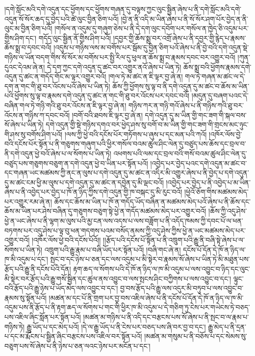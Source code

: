 །དགེ་སློང་མའི་དགེ་འདུན་དང་ཕྱོགས་དང་ཕྱོགས་གཞན་དུ་བལྟས་ཀྱང་ལུང་སྦྱིན་ཞེས་པ་ནི་དགེ་སློང་མའི་དགེ་འདུན་སོ་སོར་ཆད་དུ་བྱེད་པའི་ཚེ་ལུང་བྱིན་ཅིག་པའོ། །བྱེ་ན་ནི་འདི་མ་ཡིན་ཞེས་པ་ནི་སོ་སོར་ཤག་པོར་བྱེད་ན་ནི་ལུང་མ་བྱིན་ཅིག་པའོ། །གསོལ་ན་འདུམ་དུ་གཞུག་ཅེས་པ་ནི་དེ་དག་ལུང་དབོག་པར་གསོལ་ན་ཁྱེད་ཅི་འདུམ་པར་གྱིས་ཤིག་དང་། གདོད་ལུང་སྦྱིན་ནོ་གྱིས་ཤིག་པའོ། །དབྱར་གྱི་ཆོས་སྨྲ་བར་འགྲོ་ཞེས་པ་ནི་དབྱར་གྱི་རྙེད་པ་རྣམས་ཆོས་སྨྲ་བ་དབང་བའོ། །འདུས་པ་གཉིས་ལས་མ་བགོས་པར་སྦོམ་དུ་བྱིན་ཅིག་པའོ་ཞེས་པ་ནི་བྱེ་བའི་དགེ་འདུན་སྡེ་གཉིས་ལ་ཡོན་བདག་གིས་སོ་སོར་མ་བགོས་པར་སྤྱི་རིལ་དུ་ཕུལ་ན་ཆོས་སྨྲ་བ་རྣམས་དབང་བར་འགྱུར་བའོ། །ཀུན་དུའང་དེའམ་ཞེ་ན། དེ་དག་ཀྱང་དགེ་འདུན་དུ་ཚང་བར་འགྱུར་ནའོ་ཞེས་པ་ཡིན་ཏེ། ཆོས་སྨྲ་བའི་ཕྱོགས་རྣམས་དགེ་འདུན་དུ་ཚང་ན་གདོད་གོང་མ་ལྟར་འགྱུར་བའོ། །གལ་ཏེ་མ་ཚང་ན་ཇི་ལྟར་བྱ་ཞེ་ན། གལ་ཏེ་གཞན་མ་ཚང་ལ་དེ་དག་ན་གང་གི་ཐུ་བར་འོངས་པའོ་ཞེས་པ་ཡིན་ཏེ། ཆོས་ཀྱི་ཕྱོགས་སུ་ལྟ་བ་ནི་དགེ་འདུན་དུ་མ་ཚང་བ་ཆོས་མ་ཡིན་པའི་ཕྱོགས་སུ་ལྟ་བ་རྣམས་དགེ་འདུན་དུ་ཚང་ན་གང་གི་ཐུ་བར་འོངས་པར་དབང་བའོ། །མདུན་དུ་བཞག་པའང་དེ་བཞིན་གལ་ཏེ་གཉི་གའི་ཐུ་བར་འོངས་ན་ཇི་ལྟར་བྱ་ཞེ་ན། གཉིས་ཀར་ན་གཉི་གའོ་ཞེས་པ་ནི་གཉིས་ཀའི་ཐུ་བར་འོངས་ན་གཉིས་ཀ་དབང་བའོ། །བགོ་བའི་ཐབས་ཇི་ལྟར་བྱ་ཞེ་ན། དགེ་འདུན་དུ་མ་ཡིན་གྱི་གང་ཟག་གི་སྐལ་བས་སོ་ཞེས་པ་ཡིན་ཏེ། དགེ་འདུན་གྱི་སྡེ་གཉིས་དགའ་བར་ཕྱེད་ཤས་སུ་བགོ་བ་མ་ཡིན་གྱི་གང་ཟག་གི་གྲངས་མང་ཉུང་གི་ཤས་སུ་བགོས་ཤིག་པའོ། །ལས་ཀྱི་ཕྱེ་བའི་དངོས་པོར་གཏོགས་པ་ཞུས་པ་དང་མན་པའི་ཀའོ། །འཁོར་ལོས་བྱེ་བའི་དངོས་པོར་སྟོན་པ་ནི་གཅུགས་གཞུག་པའི་ཕྱིར་གསོལ་བའམ་ཚུལ་ཤིང་ལེན་དུ་བཙུད་པས་ཆོས་དང་བྲལ་བ་ནི་དགེ་འདུན་ཕྱེ་བའོ་ཞེས་པ་ལ་སོགས་པ་ཡིན་ཏེ། འཕགས་པའི་ལམ་དང་བྲལ་བའི་གསོ་བའམ་ཚུལ་ཤིང་ལེན་དུ་བཙུད་པས་གཅུགས་བཅུག་ན་དགེ་འདུན་ཕྱེ་བ་ཡིན་པར་སྟོན་པའོ། །འབྱེད་པར་བྱེད་པའང་དགེ་འདུན་མ་ཚང་བ་དང་གཞན་ཡང་མཚམས་ཀྱི་ནང་ན་ལུས་པ་དགེ་འདུན་དུ་མ་ཚང་ན་འདིར་མི་འགྱུར་ཞེས་པ་ནི་བྱེད་པ་དགེ་འདུན་དུ་མ་ཚང་ངམ་ཕྱི་མ་ལུས་པ་དགེ་འདུན་དུ་མ་ཚང་ན་དབྱེན་དུ་མི་ལྡང་བའོ། །འབྱེད་པར་བྱེད་པ་ནི་འབྱེད་པ་མ་ཡིན་ཞེས་པ་ནི་འབྱེད་པར་བྱེད་པ་ཁོ་ན་ཉིད་ཀྱིས་དགེ་འདུན་གྱི་ཁ་བསྐང་དུ་མི་རུང་བའོ། །ཕྱེའོ་ཅོག་གིས་མཚམས་མེད་པར་འགྱུར་རམ་ཞེ་ན། ཆོས་དང་ཆོས་མ་ཡིན་པ་ཁོ་ན་གདོད་ཡོད་བཞིན་ན་མཚམས་མེད་པའོ་ཞེས་པ་ནི་ཆོས་དང་ཆོས་མ་ཡིན་པར་ཤེས་བཞིན་དུ་གཅུགས་བཅུག་སྟེ་ཕྱེ་ན་གདོད་མཚམས་མེད་པར་འགྱུར་བའོ། །ཆོས་ཀྱི་འདུ་ཤེས་ཕྱེ་ན་ཡང་ཞེས་པ་ནི་ལྷག་མ་ལུས་པའི་མྱ་ངན་ལས་འདས་པ་ལས་བཟློག་པ་ནི་འདོད་ཁམས་ཀྱི་དབང་པོ་ལ་ཕན་བཏགས་པར་འདུ་ཤེས་པ་ལྟ་བུ་ཕན་གདགས་པའམ་བསོད་ནམས་ཀྱི་འདུ་ཤེས་ཀྱིས་ཕྱེ་ན་ཡང་མཚམས་མེད་པར་འགྱུར་བའོ། །འཁོར་ལོས་ཕྱེ་བའི་དངོས་པོའོ།། །།རྩོད་པའི་དངོས་པོ་སྟོན་པ་ནི་འཁྲུག་པའི་རྒྱུ་ནི་བཞི་སྟེ་ཞེས་པ་ལ་སོགས་པ་ཡིན་ཏེ། འཁྲུག་པའི་རྒྱུ་རྣམ་པ་བཞི་ཡོད་པར་སྟོན་པའོ། །བཞི་གང་ཞེ་ན། དངོས་པོ་དོན་དེ་ཁོ་ན་ཉིད་ལ་ཁ་མི་འདུམ་པ་དང་། སྤང་བ་དང་ཉེས་པ་ཅན་དང་ལས་འདུམ་པ་མི་སྟེར་བ་རྣམས་སོ་ཞེས་པ་ཡིན་ཏེ་མི་མཐུན་པས་རྩོད་པའི་རྒྱུ་ནི་དངོས་པོའི་དོན། རྟག་ཆད་ལ་སོགས་པའི་དེ་ཁོ་ན་ཉིད་ལ་ཁ་མི་འདུམ་པ་ལས་འབྱུང་བ་ཉིད་དང་ལུང་མི་སྟེར་བར་རྩོད་པའི་རྒྱུ་གསོ་སྦྱིན་དང་ཚུལ་ནས་འབྱུང་བ་ལས་སྤངས་ཤིང་བཀྱིགས་པ་ལས་འབྱུང་བ་དང་། ལྟུང་བའི་རྩོད་པའི་རྒྱུ་ཉེས་པ་ཡོད་མེད་ལས་འབྱུང་བ་དང་། བྱ་བས་རྩོད་པའི་རྒྱུ་ལས་འདུར་མི་བཏུབ་པ་ལས་འབྱུང་བ་རྣམས་སུ་སྟོན་པའོ། །མཚན་མ་དང་པོ་ནི་གྲག་པར་བྱ་བས་འཇིལ་ཞེས་པ་ནི་དངོས་པོ་དོན་དེ་ཁོ་ན་ཉིད་ལ་ཁ་མི་འདུམ་པས་ནི་རྩོད་པ་ནི་རྟག་ཆད་ལ་སོགས་པ་གང་གི་ཕྱིར་ཁ་མི་འདུམ་པ་དེ་གཅིག་ཏུ་ངེས་པར་གཡེངས་ཏེ་བཅད་པས་འཇིལ་ཞིང་སློན་པར་སྟོན་པའོ། །མཚན་མ་གཉིས་པ་ནི་འདི་དང་བརྩངས་པས་སོ་ཞེས་པ་ནི་སྤང་བ་ལ་རྣམ་པ་གཉིས་ཏེ། རྒྱུ་ཡོད་པ་དང་མེད་པའོ། །དེ་ལ་རྒྱུ་ཡོད་པ་ནི་ངེས་པར་བཅད་པས་ཞི་བར་བྱ་བ་དང་། རྒྱུ་མེད་པ་ནི་དྲན་པ་དང་མ་རྨོངས་པ་སྦྱིན་ཞིང་བརྩངས་པས་འཇིལ་བར་སྟོན་པའོ། །མཚན་མ་གསུམ་པ་ནི་བཅོས་པ་དང་སེམས་སུ་བཅུག་པས་སོ་ཞེས་པ་ནི་ཉེས་པ་ཅན་ལའང་ཉེས་པར་མངོན་པ་དང་། 